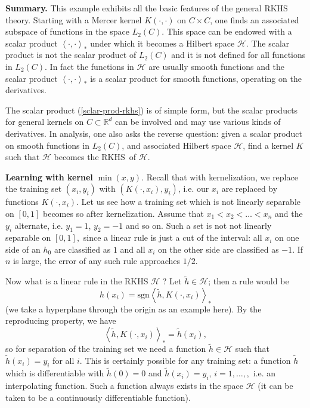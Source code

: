 \documentclass[11pt,twoside]{article}%
\theoremstyle{change}
\begin{document}
\textbf{Summary.} This example exhibits all the basic features of the general
RKHS theory. Starting with a Mercer kernel $K(\cdot,\cdot)$ on $C\times C$,
one finds an associated subspace of functions in the space $L_{2}(C)$. This
space can be endowed with a scalar product $\left\langle \cdot,\cdot
\right\rangle _{\ast}$ under which it becomes a Hilbert space $\mathcal{H}$.
The scalar product is not the scalar product of $L_{2}(C)$ and it is not
defined for all functions in $L_{2}(C)$. In fact the functions in
$\mathcal{H}$ are usually smooth functions and the scalar product
$\left\langle \cdot,\cdot\right\rangle _{\ast}$ is a scalar product for smooth
functions, operating on the derivatives.

The scalar product (\ref{sclar-prod-rkhs}) is of simple form, but the scalar
products for general kernels on $C\subset\mathbb{R}^{d}$ can be involved and
may use various kinds of derivatives. In analysis, one also asks the reverse
question: given a scalar product on smooth functions in $L_{2}(C)$, and
associated Hilbert space $\mathcal{H}$, find a kernel $K$ such that
$\mathcal{H}$ becomes the RKHS\ of $\mathcal{H}$.

\textbf{Learning with kernel }$\min(x,y)$. Recall that with kernelization, we
replace the training set $\left(  x_{i},y_{i}\right)  $ with $\left(  K\left(
\cdot,x_{i}\right)  ,y_{i}\right)  $, i.e. our $x_{i}$ are replaced by
functions $K\left(  \cdot,x_{i}\right)  $. Let us see how a training set which
is not linearly separable on $[0,1]$ becomes so after kernelization. Assume
that $x_{1}<x_{2}<\ldots<x_{n}$ and the $y_{i}$ alternate, i.e. $y_{1}=1$,
$y_{2}=-1$ and so on. Such a set is not not linearly separable on $[0,1],$
since a linear rule is just a cut of the interval: all $x_{i}$ on one side of
an $h_{0}$ are classified as $1$ and all $x_{i}$ on the other side are
classified as $-1$. If $n$ is large, the error of any such rule approaches
$1/2.$

Now what is a linear rule in the RKHS $\mathcal{H}$ ? Let $\tilde{h}%
\in\mathcal{H}$; then a rule would be
\[
h(x_{i})=\mathrm{sgn}\left\langle \tilde{h},K\left(  \cdot,x_{i}\right)
\right\rangle _{\ast}%
\]
(we take a hyperplane through the origin as an example here). By the
reproducing property, we have
\[
\left\langle \tilde{h},K\left(  \cdot,x_{i}\right)  \right\rangle _{\ast
}=\tilde{h}(x_{i}),
\]
so for separation of the training set we need a function $\tilde{h}%
\in\mathcal{H}$ such that $\tilde{h}(x_{i})=y_{i}$ for all $i$. This is
certainly possible for any training set: a function $\tilde{h}$ which is
differentiable with $\tilde{h}(0)=0$ and $\tilde{h}(x_{i})=y_{i}$,
$i=1,\ldots,,$ i.e. an interpolating function. Such a function always exists
in the space $\mathcal{H}$ (it can be taken to be a continuously
differentiable function).
\end{document}

